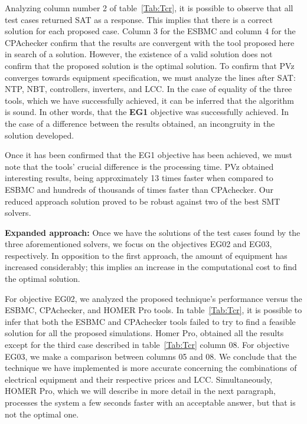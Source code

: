 \documentclass[10pt,journal,compsoc]{IEEEtran}
\begin{document}
Analyzing column number 2 of table~\ref{Tab:Tcr}, it is possible to observe that all test cases returned SAT as a response. This implies that there is a correct solution for each proposed case. Column 3 for the ESBMC and column 4 for the CPAchecker confirm that the results are convergent with the tool proposed here in search of a solution. However, the existence of a valid solution does not confirm that the proposed solution is the optimal solution. To confirm that PVz converges towards equipment specification, we must analyze the lines after SAT: NTP, NBT, controllers, inverters, and LCC. In the case of equality of the three tools, which we have successfully achieved, it can be inferred that the algorithm is sound. In other words, that the \textbf{EG1} objective was successfully achieved. In the case of a difference between the results obtained, an incongruity in the solution developed.

Once it has been confirmed that the EG1 objective has been achieved, we must note that the tools' crucial difference is the processing time. PVz obtained interesting results, being approximately 13 times faster when compared to ESBMC and hundreds of thousands of times faster than CPAchecker. Our reduced approach solution proved to be robust against two of the best SMT solvers.

\textbf{Expanded approach:} Once we have the solutions of the test cases found by the three aforementioned solvers, we focus on the objectives EG02 and EG03, respectively. In opposition to the first approach, the amount of equipment has increased considerably; this implies an increase in the computational cost to find the optimal solution.

For objective EG02, we analyzed the proposed technique's performance versus the ESBMC, CPAchecker, and HOMER Pro tools. In table~\ref{Tab:Tcr}, it is possible to infer that both the ESBMC and CPAchecker tools failed to try to find a feasible solution for all the proposed simulations. Homer Pro, obtained all the results except for the third case described in table~\ref{Tab:Tcr} column 08. For objective EG03, we make a comparison between columns 05 and 08. We conclude that the technique we have implemented is more accurate concerning the combinations of electrical equipment and their respective prices and LCC. Simultaneously, HOMER Pro, which we will describe in more detail in the next paragraph, processes the system a few seconds faster with an acceptable answer, but that is not the optimal one.
\end{document}
